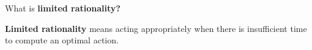 
\begin{flashcard}[Question]{What is \textbf{limited rationality?}}
\begin{center}
\textbf{Limited rationality} means acting appropriately when there is insufficient time to compute an optimal action.
\end{center}
\end{flashcard}

